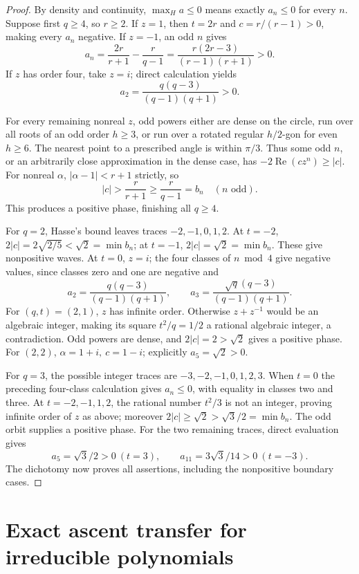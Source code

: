 \documentclass[11pt]{article}
\newcommand{\Real}{\operatorname{Re}}
\begin{document}
\begin{proof}
By density and continuity, \(\max_Ha\leq0\) means exactly
\(a_n\leq0\) for every \(n\).
Suppose first \(q\geq4\), so \(r\geq2\).
If \(z=1\), then \(t=2r\) and \(c=r/(r-1)>0\), making every
\(a_n\) negative. If \(z=-1\), an odd \(n\) gives
\[
 a_n=\frac{2r}{r+1}-\frac r{q-1}
       =\frac{r(2r-3)}{(r-1)(r+1)}>0.
\]
If \(z\) has order four, take \(z=i\); direct calculation yields
\[
 a_2=\frac{q(q-3)}{(q-1)(q+1)}>0.
\]

For every remaining nonreal \(z\), odd powers either are dense on the
circle, run over all roots of an odd order \(h\geq3\), or run over a
rotated regular \(h/2\)-gon for even \(h\geq6\). The nearest point to
a prescribed angle is within \(\pi/3\). Thus some odd \(n\), or an
arbitrarily close approximation in the dense case, has
\(-2\Real(cz^n)\geq |c|\).
For nonreal \(\alpha\), \(|\alpha-1|<r+1\) strictly, so
\[
 |c|>\frac r{r+1}\geq\frac r{q-1}=b_n
 \quad(n\text{ odd}).
\]
This produces a positive phase, finishing all \(q\geq4\).

For \(q=2\), Hasse's bound leaves traces \(-2,-1,0,1,2\).
At \(t=-2\), \(2|c|=2\sqrt{2/5}<\sqrt2=\min b_n\);
at \(t=-1\), \(2|c|=\sqrt2=\min b_n\). These give nonpositive
waves. At \(t=0\), \(z=i\); the four classes of \(n\bmod4\) give
negative values, since classes zero and one are negative and
\[
 a_2=\frac{q(q-3)}{(q-1)(q+1)},\qquad
 a_3=\frac{\sqrt q(q-3)}{(q-1)(q+1)}.
\]
For \((q,t)=(2,1)\), \(z\) has infinite order. Otherwise
\(z+z^{-1}\) would be an algebraic integer, making its square
\(t^2/q=1/2\) a rational algebraic integer, a contradiction.
Odd powers are dense, and \(2|c|=2>\sqrt2\) gives a positive phase.
For \((2,2)\), \(\alpha=1+i,\ c=1-i\); explicitly \(a_5=\sqrt2>0\).

For \(q=3\), the possible integer traces are \(-3,-2,-1,0,1,2,3\).
When \(t=0\) the preceding four-class calculation gives \(a_n\leq0\),
with equality in classes two and three. At \(t=-2,-1,1,2\), the
rational number \(t^2/3\) is not an integer, proving infinite order
of \(z\) as above; moreover
\(2|c|\geq\sqrt2>\sqrt3/2=\min b_n\).
The odd orbit supplies a positive phase. For the two remaining
traces, direct evaluation gives
\[
 a_5=\sqrt3/2>0\ (t=3),\qquad
 a_{11}=3\sqrt3/14>0\ (t=-3).
\]
The dichotomy now proves all assertions, including the nonpositive
boundary cases.
\end{proof}

\section{Exact ascent transfer for irreducible polynomials}
\end{document}
